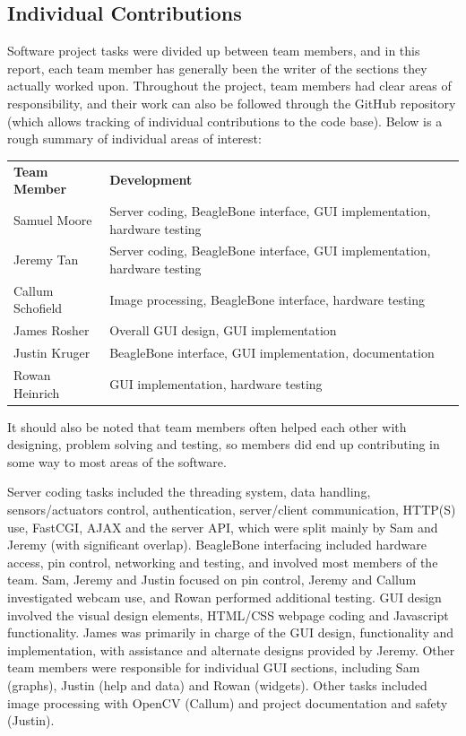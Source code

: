\subsection{Individual Contributions}

Software project tasks were divided up between team members, and in this report, each team member has generally been the writer of the sections they actually worked upon. Throughout the project, team members had clear areas of responsibility, and their work can also be followed through the GitHub repository (which allows tracking of individual contributions to the code base). Below is a rough summary of individual areas of interest:

\begin{tabular}{l|l}
	{\bf Team Member} & {\bf Development} \\
	Samuel Moore & Server coding, BeagleBone interface, GUI implementation, hardware testing \\
	Jeremy Tan & Server coding, BeagleBone interface, GUI implementation, hardware testing \\
	Callum Schofield & Image processing, BeagleBone interface, hardware testing \\
	James Rosher & Overall GUI design, GUI implementation \\
	Justin Kruger & BeagleBone interface,  GUI implementation, documentation \\
	Rowan Heinrich & GUI implementation, hardware testing
\end{tabular}

It should also be noted that team members often helped each other with designing, problem solving and testing, so members did end up contributing in some way to most areas of the software.


Server coding tasks included the threading system, data handling, sensors/actuators control, authentication, server/client communication, HTTP(S) use, FastCGI, AJAX and the server API, which were split mainly by Sam and Jeremy (with significant overlap). BeagleBone interfacing included hardware access, pin control, networking and testing, and involved most members of the team. Sam, Jeremy and Justin focused on pin control, Jeremy and Callum investigated webcam use, and Rowan performed additional testing. GUI design involved the visual design elements, HTML/CSS webpage coding and Javascript functionality. James was primarily in charge of the GUI design, functionality and implementation, with assistance and alternate designs provided by Jeremy. Other team members were responsible for individual GUI sections, including Sam (graphs), Justin (help and data) and Rowan (widgets). Other tasks included image processing with OpenCV (Callum) and project documentation and safety (Justin).

